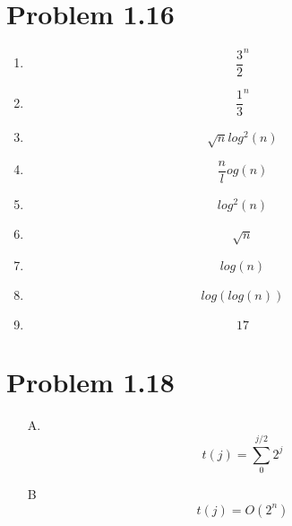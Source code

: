 \documentclass{article}
\begin{document}
		\section{Problem 1.16}
		\begin{enumerate}
			\item \begin{equation*}\frac{3}2^n \end{equation*}
			\item \begin{equation*} \frac{1}3^n \end{equation*}
			\item \begin{equation*} \sqrt{n}log^2(n) \end{equation*}
			\item \begin{equation*} \frac{n}log(n) \end{equation*}
			\item \begin{equation*} log^2(n) \end{equation*}
			\item \begin{equation*} \sqrt{n} \end{equation*}
			\item \begin{equation*} log(n) \end{equation*}
			\item \begin{equation*} log(log(n)) \end{equation*}
			\item \begin{equation*} 17 \end{equation*}
		\end{enumerate}
		
		
		
		\section{Problem 1.18}

		\begin{enumerate}
		\item[A.] \begin{equation*}
		t(j) = \sum_{0}^{j/2}2^j
		\end{equation*}
		
		\item[B] \begin{equation*}
			t(j) = O(2^n)
		\end{equation*}
	\end{enumerate}
	
\end{document}

